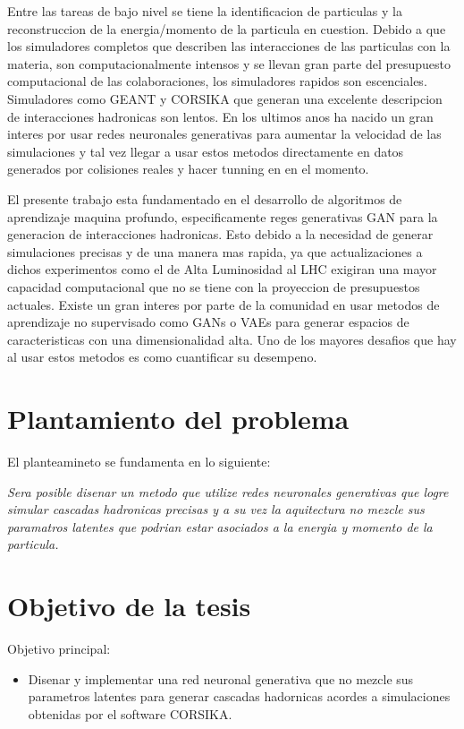 Entre las tareas de bajo nivel se tiene la identificacion de particulas y la reconstruccion de la energia/momento de la particula en cuestion.
Debido a que los simuladores completos que describen las interacciones de las particulas con la materia, son computacionalmente intensos
y se llevan gran parte del presupuesto computacional de las colaboraciones, los simuladores rapidos son escenciales.
Simuladores como GEANT y CORSIKA que generan una excelente descripcion de interacciones hadronicas son lentos.
En los ultimos anos ha nacido un gran interes por usar redes neuronales generativas para aumentar la velocidad de las simulaciones y tal vez
llegar a usar estos metodos directamente en datos generados por colisiones reales y hacer tunning en en el momento.

El presente trabajo esta fundamentado en el desarrollo de algoritmos de aprendizaje maquina profundo, especificamente reges generativas GAN 
para la generacion de interacciones hadronicas. Esto debido a la necesidad de generar simulaciones precisas y de una manera mas rapida,
ya que actualizaciones a dichos experimentos como el de Alta Luminosidad al LHC exigiran una mayor capacidad computacional que no se tiene con la proyeccion de presupuestos actuales.
Existe un gran interes por parte de la comunidad en usar metodos de aprendizaje no supervisado como GANs o VAEs para generar espacios de caracteristicas con una dimensionalidad alta.
Uno de los mayores desafios que hay al usar estos metodos es como cuantificar su desempeno.

\section{Plantamiento del problema}

El planteamineto se fundamenta en lo siguiente:

\emph{Sera posible disenar un metodo que utilize redes neuronales generativas que logre simular cascadas hadronicas precisas y a su vez la aquitectura no mezcle sus paramatros latentes que podrian estar asociados a la energia y momento de la particula.} 


\section{Objetivo de la tesis}
Objetivo principal:
\begin{itemize}
    \item Disenar y implementar una red neuronal generativa que no mezcle sus parametros latentes para generar cascadas hadornicas acordes a simulaciones obtenidas por el software CORSIKA. 
\end{itemize}

